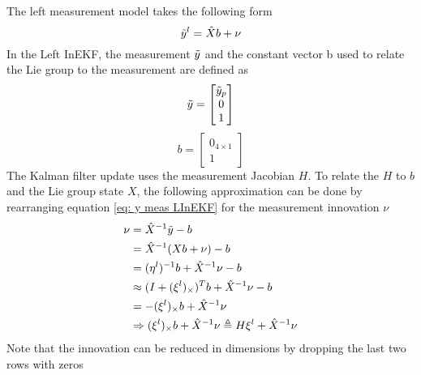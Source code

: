 The left measurement model takes the following form \cite{Contact-Aided_Invarant_EKF}
\begin{equation}
    \Tilde{y}^l = \hat{X} b + \nu
    \label{eq: left measurement form}
\end{equation}
In the Left InEKF, the measurement $\Tilde{y}$ and the constant vector b used to relate the Lie group to the measurement are defined as 
\begin{equation}
    \Tilde{y} = \begin{bmatrix}
        \Tilde{y}_p \\
        0 \\
        1
    \end{bmatrix}
    \label{eq: y meas LInEKF}
\end{equation}
\begin{equation}
    b = \begin{bmatrix}
        0_{4 \times 1} \\
        1
    \end{bmatrix}
    \label{eq: b LInEKF}
\end{equation}
The Kalman filter update uses the measurement Jacobian $H$. To relate the $H$ to $b$ and the Lie group state $X$, the following approximation can be done by rearranging equation \eqref{eq: y meas LInEKF} for the measurement innovation $\nu$
\begin{equation}
    \begin{split}
        \nu &= \hat{X}^{-1} \Tilde{y} - b \\
            &= \hat{X}^{-1} (X b + \nu) - b \\
            &= (\eta^l)^{-1} b + \hat{X}^{-1} \nu - b \\
            &\approx (I + (\xi^l)_{\times})^T b + \hat{X}^{-1} \nu - b \\
            &= -(\xi^l)_{\times} b + \hat{X}^{-1} \nu  \\
            &\Rightarrow (\xi^l)_{\times} b + \hat{X}^{-1} \nu \triangleq H \xi^l + \hat{X}^{-1} \nu
        \label{eq: H proof for LInEKF}
    \end{split}
\end{equation}
Note that the innovation can be reduced in dimensions by dropping the last two rows with zeros

